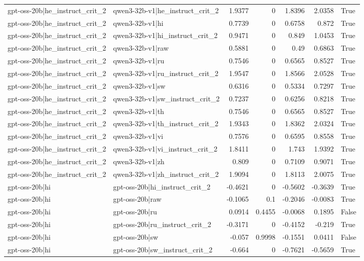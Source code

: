 \begin{table}
\begin{tabular}{l l r r r r l}
gpt-oss-20b|he_instruct_crit_2 & qwen3-32b-v1|he_instruct_crit_2 & 1.9377 & 0 & 1.8396 & 2.0358 & True \\
gpt-oss-20b|he_instruct_crit_2 & qwen3-32b-v1|hi & 0.7739 & 0 & 0.6758 & 0.872 & True \\
gpt-oss-20b|he_instruct_crit_2 & qwen3-32b-v1|hi_instruct_crit_2 & 0.9471 & 0 & 0.849 & 1.0453 & True \\
gpt-oss-20b|he_instruct_crit_2 & qwen3-32b-v1|raw & 0.5881 & 0 & 0.49 & 0.6863 & True \\
gpt-oss-20b|he_instruct_crit_2 & qwen3-32b-v1|ru & 0.7546 & 0 & 0.6565 & 0.8527 & True \\
gpt-oss-20b|he_instruct_crit_2 & qwen3-32b-v1|ru_instruct_crit_2 & 1.9547 & 0 & 1.8566 & 2.0528 & True \\
gpt-oss-20b|he_instruct_crit_2 & qwen3-32b-v1|sw & 0.6316 & 0 & 0.5334 & 0.7297 & True \\
gpt-oss-20b|he_instruct_crit_2 & qwen3-32b-v1|sw_instruct_crit_2 & 0.7237 & 0 & 0.6256 & 0.8218 & True \\
gpt-oss-20b|he_instruct_crit_2 & qwen3-32b-v1|th & 0.7546 & 0 & 0.6565 & 0.8527 & True \\
gpt-oss-20b|he_instruct_crit_2 & qwen3-32b-v1|th_instruct_crit_2 & 1.9343 & 0 & 1.8362 & 2.0324 & True \\
gpt-oss-20b|he_instruct_crit_2 & qwen3-32b-v1|vi & 0.7576 & 0 & 0.6595 & 0.8558 & True \\
gpt-oss-20b|he_instruct_crit_2 & qwen3-32b-v1|vi_instruct_crit_2 & 1.8411 & 0 & 1.743 & 1.9392 & True \\
gpt-oss-20b|he_instruct_crit_2 & qwen3-32b-v1|zh & 0.809 & 0 & 0.7109 & 0.9071 & True \\
gpt-oss-20b|he_instruct_crit_2 & qwen3-32b-v1|zh_instruct_crit_2 & 1.9094 & 0 & 1.8113 & 2.0075 & True \\
gpt-oss-20b|hi & gpt-oss-20b|hi_instruct_crit_2 & -0.4621 & 0 & -0.5602 & -0.3639 & True \\
gpt-oss-20b|hi & gpt-oss-20b|raw & -0.1065 & 0.1 & -0.2046 & -0.0083 & True \\
gpt-oss-20b|hi & gpt-oss-20b|ru & 0.0914 & 0.4455 & -0.0068 & 0.1895 & False \\
gpt-oss-20b|hi & gpt-oss-20b|ru_instruct_crit_2 & -0.3171 & 0 & -0.4152 & -0.219 & True \\
gpt-oss-20b|hi & gpt-oss-20b|sw & -0.057 & 0.9998 & -0.1551 & 0.0411 & False \\
gpt-oss-20b|hi & gpt-oss-20b|sw_instruct_crit_2 & -0.664 & 0 & -0.7621 & -0.5659 & True \\

\end{tabular}
\end{table}
